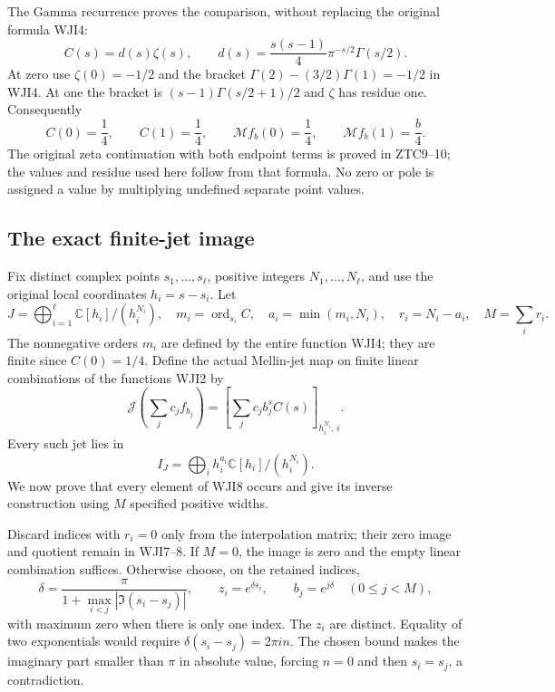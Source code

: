 \documentclass[11pt]{article}
\begin{document}
The Gamma recurrence proves the comparison, without replacing
the original formula WJI4:
\begin{equation}\tag{WJI5}
 C(s)=d(s)\zeta(s),\qquad
 d(s)=\frac{s(s-1)}4\pi^{-s/2}\Gamma(s/2).
\end{equation}
At zero use $\zeta(0)=-1/2$ and the bracket
$\Gamma(2)-(3/2)\Gamma(1)=-1/2$ in WJI4.
At one the bracket is
$(s-1)\Gamma(s/2+1)/2$ and $\zeta$ has residue one.
Consequently
\begin{equation}\tag{WJI6}
 C(0)=\frac14,\qquad C(1)=\frac14,\qquad
 \mathcal Mf_b(0)=\frac14,\qquad
 \mathcal Mf_b(1)=\frac b4.
\end{equation}
The original zeta continuation with both endpoint terms is proved
in ZTC9--10; the values and residue used here follow from that
formula. No zero or pole is assigned a value by multiplying
undefined separate point values.

\subsection{The exact finite-jet image}

Fix distinct complex points $s_1,\ldots,s_\ell$, positive integers
$N_1,\ldots,N_\ell$, and use the original local coordinates
$h_i=s-s_i$. Let
\begin{equation}\tag{WJI7}
 J=\bigoplus_{i=1}^{\ell}\mathbb C[h_i]/(h_i^{N_i}),
 \quad m_i=\operatorname{ord}_{s_i}C,\quad
 a_i=\min(m_i,N_i),\quad r_i=N_i-a_i,\quad M=\sum_i r_i.
\end{equation}
The nonnegative orders $m_i$ are defined by the entire function
WJI4; they are finite since $C(0)=1/4$. Define the actual
Mellin-jet map on finite linear combinations of the functions
WJI2 by
\[
 \mathcal J\!\left(\sum_j c_j f_{b_j}\right)
   =\left[\sum_j c_j b_j^s C(s)\right]_{h_i^{N_i},\,i}.
\]
Every such jet lies in
\begin{equation}\tag{WJI8}
 I_J=\bigoplus_i h_i^{a_i}\mathbb C[h_i]/(h_i^{N_i}).
\end{equation}
We now prove that every element of WJI8 occurs and give its
inverse construction using $M$ specified positive widths.

Discard indices with $r_i=0$ only from the interpolation matrix;
their zero image and quotient remain in WJI7--8. If $M=0$,
the image is zero and the empty linear combination suffices.
Otherwise choose, on the retained indices,
\begin{equation}\tag{WJI9}
 \delta=\frac{\pi}{1+\max_{i<j}|\Im(s_i-s_j)|},
 \qquad z_i=e^{\delta s_i},\qquad b_j=e^{j\delta}
       \quad(0\le j<M),
\end{equation}
with maximum zero when there is only one index.
The $z_i$ are distinct. Equality of two exponentials would
require $\delta(s_i-s_j)=2\pi i n$. The chosen bound makes
the imaginary part smaller than $\pi$ in absolute value,
forcing $n=0$ and then $s_i=s_j$, a contradiction.
\end{document}
